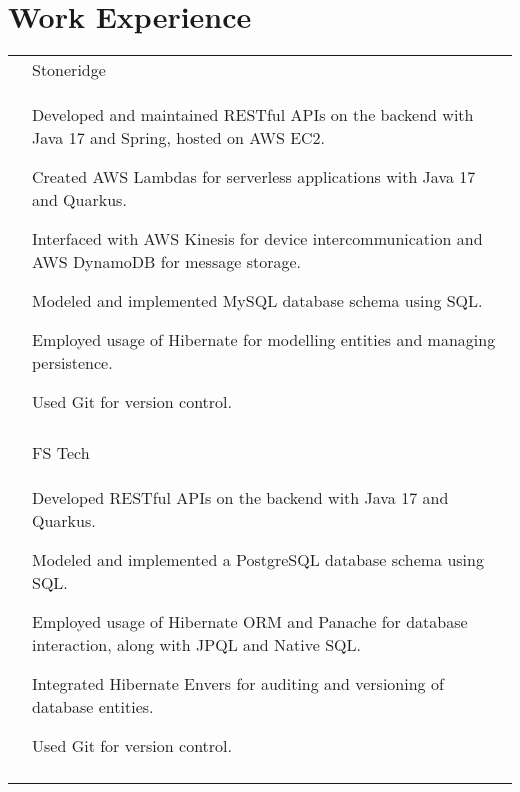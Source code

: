 \documentclass[a4paper,12pt]{article}
\begin{document}
\section{Work Experience}
\begin{longtable}{r|p{14.3cm}}

& \large{Stoneridge} \\*
&\small{
\begin{itemize*}[label=\Large\textbullet]
    \item Developed and maintained RESTful APIs on the backend with Java 17 and Spring, hosted on AWS EC2.
    \item Created AWS Lambdas for serverless applications with Java 17 and Quarkus.
    \item Interfaced with AWS Kinesis for device intercommunication and AWS DynamoDB for \mbox{message} storage.
    \item Modeled and implemented MySQL database schema using SQL.
    \item \mbox{Employed} usage of Hibernate for modelling entities and \mbox{managing} persistence.
    \item Used Git for version control.
    \end{itemize*}
}
\\ \\

 & \large{FS Tech} \\*
 &\small{
    \begin{itemize*}[label=\Large\textbullet]
        \item Developed RESTful APIs on the backend with Java 17 and Quarkus.
        \item Modeled and \mbox{implemented} a PostgreSQL database schema using SQL.
        \item Employed usage of Hibernate ORM and Panache for database interaction, along with JPQL and Native SQL.
        \item \mbox{Integrated} Hibernate Envers for auditing and versioning of database entities.
        \item Used Git for version control.
     \end{itemize*}
 }
 \\ \\



\end{longtable}
\end{document}
